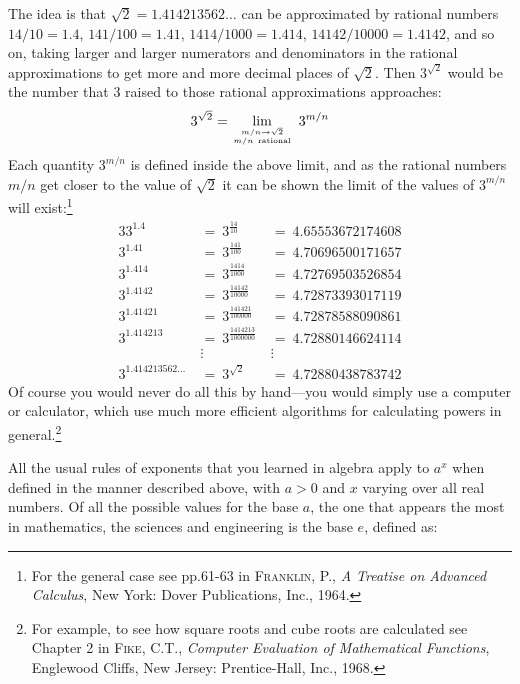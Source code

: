 The idea is that $\sqrt{2} = 1.414213562\ldots$ can be approximated
by rational numbers $14/10 = 1.4$, $141/100 = 1.41$, $1414/1000 = 1.414$,
$14142/10000 = 1.4142$, and so on, taking larger and larger numerators and
denominators in the rational approximations to get more and more decimal places
of $\sqrt{2}$. Then $3^{\sqrt{2}}$ would be the number that 3 raised to those
rational approximations approaches:
\[
3^{\sqrt{2}} = \lim_{\genfrac{}{}{0pt}{}{m/n \to \sqrt{2}}{m/n~\text{rational}}}\;3^{m/n}
\]
Each quantity $3^{m/n}$ is defined inside the above limit, and as the rational
numbers $m/n$ get closer to the value of $\sqrt{2}$ it can be shown the limit
of the values of $3^{m/n}$ will exist:\footnote{For the general case see pp.61-63 in
\textsc{Franklin, P.}, \emph{A Treatise on Advanced Calculus}, New York: Dover
Publications, Inc., 1964.}
\begin{alignat*}{3}
3^{1.4} ~&=~ 3^{\frac{14}{10}} ~&=~ 4.65553672174608\\
3^{1.41} ~&=~ 3^{\frac{141}{100}} ~&=~ 4.70696500171657\\
3^{1.414} ~&=~ 3^{\frac{1414}{1000}} ~&=~ 4.72769503526854\\
3^{1.4142} ~&=~ 3^{\frac{14142}{10000}} ~&=~ 4.72873393017119\\
3^{1.41421} ~&=~ 3^{\frac{141421}{100000}} ~&=~ 4.72878588090861\\
3^{1.414213} ~&=~ 3^{\frac{1414213}{1000000}} ~&=~ 4.72880146624114\\
{} &\vdots \quad ~&\vdots \\
3^{1.414213562\ldots} ~&=~ 3^{\sqrt{2}} ~&=~ 4.72880438783742
\end{alignat*}
Of course you would never do all this by hand---you would simply use a computer
or calculator, which use much more efficient algorithms for calculating powers
in general.\footnote{For example, to see how square roots and cube roots are
calculated see Chapter 2 in \textsc{Fike, C.T.}, \emph{Computer Evaluation of
Mathematical Functions}, Englewood Cliffs, New Jersey: Prentice-Hall, Inc., 1968.}

All the usual rules of exponents that you learned in algebra apply to $a^x$ when
defined in the manner described above, with $a > 0$ and $x$ varying over
all real numbers. Of all the possible values for the base $a$, the one that
appears the most in mathematics, the sciences and engineering is the base
$e$, defined as:


